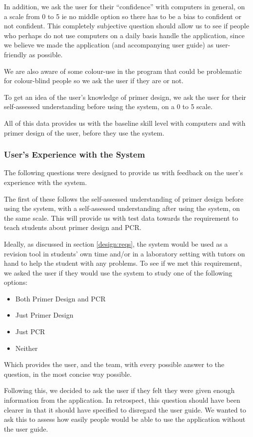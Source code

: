 In addition, we ask the user for their ``confidence'' with computers
in general, on a scale from 0 to 5 ie no middle option so there has
to be a bias to confident or not confident.
This completely subjective question should allow us to see if people
who perhaps do not use computers on a daily basis handle the
application, since we believe we made the application (and
accompanying user guide) as user-friendly as possible.

We are also aware of some colour-use in the program that could be
problematic for colour-blind people so we ask the user if they are or
not.

To get an idea of the user's knowledge of primer design, we ask the
user for their self-assessed understanding before using the system, on
a 0 to 5 scale.

All of this data provides us with the baseline skill level with
computers and with primer design of the user, before they use the
system.

\subsubsection{User's Experience with the System}
The following questions were designed to provide us with feedback on
the user's experience with the system.

The first of these follows the self-assessed understanding of primer
design before using the system, with a self-assessed understanding
after using the system, on the same scale.
This will provide us with test data towards the requirement to teach
students about primer design and PCR.

Ideally, as discussed in section \ref{design:reqs}, the system would
be used as a revision tool in students' own time and/or in a
laboratory setting with tutors on hand to help the student with any
problems.
To see if we met this requirement, we asked the user if they would use
the system to study one of the following options:
\begin{itemize}
\item Both Primer Design and PCR
\item Just Primer Design
\item Just PCR
\item Neither
\end{itemize}
Which provides the user, and the team, with every possible answer to
the question, in the most concise way possible.

Following this, we decided to ask the user if they felt they were
given enough information from the application.
In retrospect, this question should have been clearer in that it
should have specified to disregard the user guide.
We wanted to ask this to assess how easily people would be able to use
the application without the user guide.

